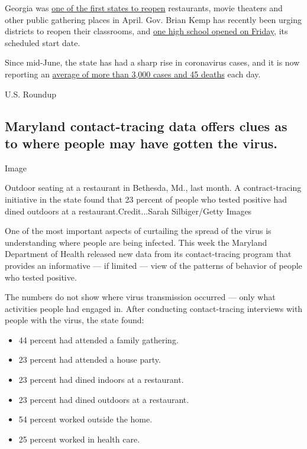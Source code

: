 Georgia was
\href{https://www.nytimes3xbfgragh.onion/2020/04/20/us/coronavirus-us-hot-spots-reopening.html}{one
of the first states to reopen} restaurants, movie theaters and other
public gathering places in April. Gov. Brian Kemp has recently been
urging districts to reopen their classrooms, and
\href{https://www.nytimes3xbfgragh.onion/2020/07/27/us/covid-georgia-schools-masks.html}{one
high school opened on Friday}, its scheduled start date.

Since mid-June, the state has had a sharp rise in coronavirus cases, and
it is now reporting an
\href{https://www.nytimes3xbfgragh.onion/interactive/2020/us/georgia-coronavirus-cases.html}{average
of more than 3,000 cases and 45 deaths} each day.

U.S. Roundup

\hypertarget{maryland-contact-tracing-data-offers-clues-as-to-where-people-may-have-gotten-the-virus}{%
\subsection{Maryland contact-tracing data offers clues as to where
people may have gotten the
virus.}\label{maryland-contact-tracing-data-offers-clues-as-to-where-people-may-have-gotten-the-virus}}

Image

Outdoor seating at a restaurant in Bethesda, Md., last month. A
contract-tracing initiative in the state found that 23 percent of people
who tested positive had dined outdoors at a restaurant.Credit...Sarah
Silbiger/Getty Images

One of the most important aspects of curtailing the spread of the virus
is understanding where people are being infected. This week the Maryland
Department of Health released new data from its contact-tracing program
that provides an informative --- if limited --- view of the patterns of
behavior of people who tested positive.

The numbers do not show where virus transmission occurred --- only what
activities people had engaged in. After conducting contact-tracing
interviews with people with the virus, the state found:

\begin{itemize}
\item
  44 percent had attended a family gathering.
\item
  23 percent had attended a house party.
\item
  23 percent had dined indoors at a restaurant.
\item
  23 percent had dined outdoors at a restaurant.
\item
  54 percent worked outside the home.
\item
  25 percent worked in health care.
\end{itemize}

